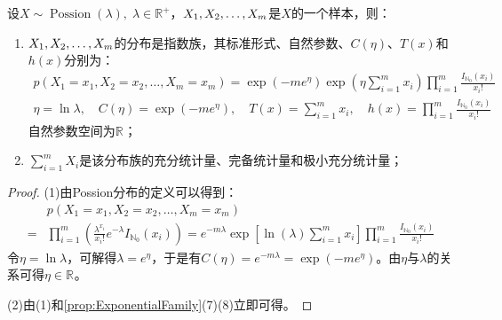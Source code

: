 \begin{theorem}
	设$X\sim\operatorname{Possion}(\lambda),\;\lambda\in\mathbb{R}^+$，$X_1, X_2, \dots, X_{m}$是$X$的一个样本，则：
	\begin{enumerate}
		\item $X_1, X_2, \dots, X_{m}$的分布是指数族，其标准形式、自然参数、$C(\eta)$、$T(x)$和$h(x)$分别为：
		\begin{gather*}
			p(X_1=x_1,X_2=x_2,\dots,X_m=x_m)=\exp(-me^{\eta})\exp\left(\eta\sum_{i=1}^{m}x_i\right)\prod_{i=1}^{m}\frac{I_{\mathbb{N}_0}(x_i)}{x_i!} \\
			\eta=\ln\lambda,\quad C(\eta)=\exp(-me^{\eta}),\quad T(x)=\sum_{i=1}^{m}x_i,\quad h(x)=\prod_{i=1}^{m}\frac{I_{\mathbb{N}_0}(x_i)}{x_i!}
		\end{gather*}
		自然参数空间为$\mathbb{R}^{}$；
		\item $\sum\limits_{i=1}^{m}X_i$是该分布族的充分统计量、完备统计量和极小充分统计量；
	\end{enumerate}
\end{theorem}
\begin{proof}
	(1)由Possion分布的定义可以得到：
	\begin{align*}
		&p(X_1=x_1,X_2=x_2,\dots,X_m=x_m) \\
		=&\prod_{i=1}^{m}\left(\frac{\lambda^{x_i}}{x_i!}e^{-\lambda}I_{\mathbb{N}_0}(x_i)\right) =e^{-m\lambda}\exp\left[\ln(\lambda)\sum_{i=1}^{m}x_i\right]\prod_{i=1}^{m}\frac{I_{\mathbb{N}_0}(x_i)}{x_i!}
	\end{align*}
	令$\eta=\ln\lambda$，可解得$\lambda=e^{\eta}$，于是有$C(\eta)=e^{-m\lambda}=\exp(-me^{\eta})$。由$\eta$与$\lambda$的关系可得$\eta\in\mathbb{R}^{}$。\par
	(2)由(1)和\cref{prop:ExponentialFamily}(7)(8)立即可得。
\end{proof}

